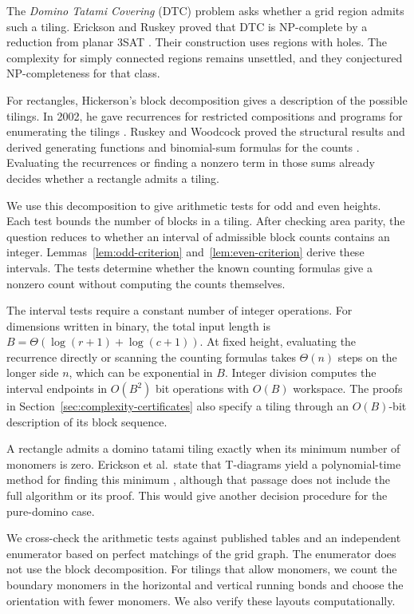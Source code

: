 \documentclass[11pt, reqno]{amsart}
\theoremstyle{definition}
\theoremstyle{remark}
\numberwithin{equation}{section}
\begin{document}
The \emph{Domino Tatami Covering} (DTC) problem asks whether a grid region
admits such a tiling. Erickson and Ruskey proved that DTC is NP-complete
by a reduction from planar 3SAT \cite{er13}. Their construction uses
regions with holes. The complexity for simply connected regions remains
unsettled, and they conjectured NP-completeness for that class.

For rectangles, Hickerson's block decomposition gives a description of
the possible tilings. In 2002, he gave recurrences for restricted
compositions and programs for enumerating the tilings \cite{hickerson}.
Ruskey and Woodcock proved the structural results and derived generating
functions and binomial-sum formulas for the counts
\cite[Corollary~3.4 and Theorem~3.5]{ruskey}. Evaluating the recurrences
or finding a nonzero term in those sums already decides whether a
rectangle admits a tiling.

We use this decomposition to give arithmetic tests for odd and even
heights. Each test bounds the number of blocks in a tiling. After
checking area parity, the question reduces to whether an interval of
admissible block counts contains an integer.
Lemmas~\ref{lem:odd-criterion} and~\ref{lem:even-criterion} derive these
intervals. The tests determine whether the known counting formulas give
a nonzero count without computing the counts themselves.

The interval tests require a constant number of integer operations.
For dimensions written in binary, the total input length is
$B=\Theta(\log(r+1)+\log(c+1))$. At fixed height, evaluating the
recurrence directly or scanning the counting formulas takes $\Theta(n)$
steps on the longer side $n$, which can be exponential in $B$.
Integer division computes the interval endpoints in $O(B^2)$ bit
operations with $O(B)$ workspace. The proofs in Section~\ref{sec:complexity-certificates} also specify
a tiling through an $O(B)$-bit description of its block sequence.

A rectangle admits a domino tatami tiling exactly when its minimum
number of monomers is zero. Erickson et al.\ state that T-diagrams
yield a polynomial-time method for finding this minimum
\cite[Section~4.2]{erws11}, although that passage does not include the
full algorithm or its proof. This would give another decision procedure
for the pure-domino case.

We cross-check the arithmetic tests against published tables and an
independent enumerator based on perfect matchings of the grid graph.
The enumerator does not use the block decomposition. For tilings that
allow monomers, we count the boundary monomers in the horizontal and
vertical running bonds and choose the orientation with fewer monomers.
We also verify these layouts computationally.
\end{document}
